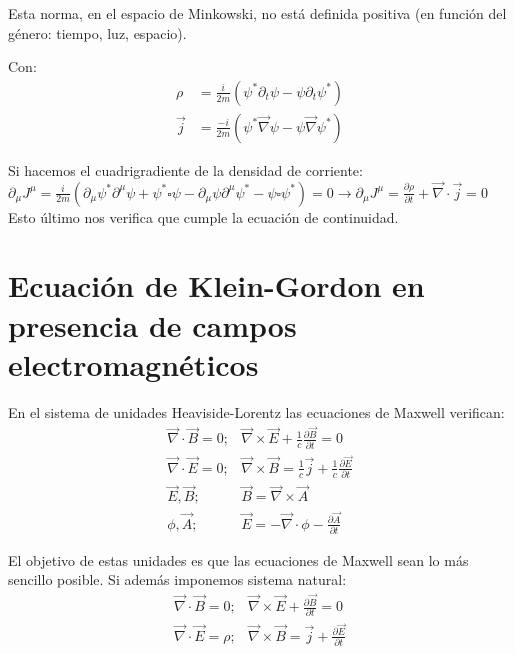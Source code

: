 Esta norma, en el espacio de Minkowski, no está definida positiva (en función del género: tiempo, luz, espacio).


Con:
$$
\begin{aligned}
\rho & =\frac{i}{2 m}\left(\psi^{*} \partial_{t} \psi-\psi \partial_{t} \psi^{*}\right) \\
\vec{j} & =\frac{-i}{2 m}\left(\psi^{*} \vec{\nabla} \psi-\psi \vec{\nabla} \psi^{*}\right)
\end{aligned}
$$

Si hacemos el cuadrigradiente de la densidad de corriente:
$\partial_{\mu} J^{\mu}=\frac{i}{2 m}\left(\partial_{\mu} \psi^{*} \partial^{\mu} \psi+\psi^{*} \square \psi-\partial_{\mu} \psi \partial^{\mu} \psi^{*}-\psi \square \psi^{*}\right)=0 \rightarrow \partial_{\mu} J^{\mu}=\frac{\partial \rho}{\partial t}+\vec{\nabla} \cdot \vec{j}=0$
Esto último nos verifica que cumple la ecuación de continuidad.
\section{Ecuación de Klein-Gordon en presencia de campos electromagnéticos}
En el sistema de unidades Heaviside-Lorentz las ecuaciones de Maxwell verifican:
$$
\begin{array}{cc}
\vec{\nabla} \cdot \vec{B}=0 ; & \vec{\nabla} \times \vec{E}+\frac{1}{c} \frac{\partial \vec{B}}{\partial t}=0 \\
\vec{\nabla} \cdot \vec{E}=0 ; & \vec{\nabla} \times \vec{B}=\frac{1}{c} \vec{j}+\frac{1}{c} \frac{\partial \vec{E}}{\partial t} \\
\vec{E}, \vec{B} ; & \vec{B}=\vec{\nabla} \times \vec{A} \\
\phi, \vec{A} ; & \vec{E}=-\vec{\nabla} \cdot \phi-\frac{\partial \vec{A}}{\partial t}
\end{array}
$$

El objetivo de estas unidades es que las ecuaciones de Maxwell sean lo más sencillo posible. Si además imponemos sistema natural:
$$
\begin{array}{ll}
\vec{\nabla} \cdot \vec{B}=0 ; & \vec{\nabla} \times \vec{E}+\frac{\partial \vec{B}}{\partial t}=0 \\
\vec{\nabla} \cdot \vec{E}=\rho ; & \vec{\nabla} \times \vec{B}=\vec{j}+\frac{\partial \vec{E}}{\partial t}
\end{array}
$$

